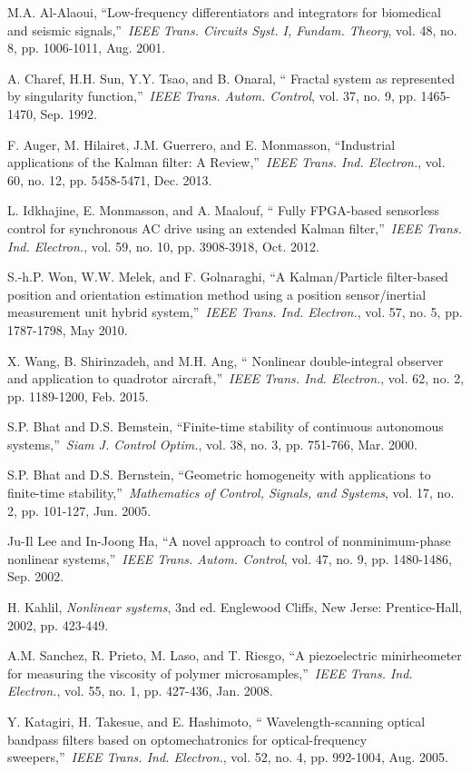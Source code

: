 \documentclass[10pt,journal]{IEEEtran}
\begin{document}
\begin{thebibliography}{99}
\bibitem{} M.A. Al-Alaoui, \textquotedblleft Low-frequency differentiators
and integrators for biomedical and seismic signals,\textquotedblright\ \emph{IEEE Trans. Circuits Syst. I, Fundam. Theory}, vol. 48, no. 8, pp.
1006-1011, Aug. 2001.

\bibitem{} A. Charef, H.H. Sun, Y.Y. Tsao, and B. Onaral, \textquotedblleft
Fractal system as represented by singularity function,\textquotedblright\
\emph{IEEE Trans. Autom. Control}, vol. 37, no. 9, pp. 1465-1470, Sep. 1992.

\bibitem{} F. Auger, M. Hilairet, J.M. Guerrero, and E. Monmasson,
\textquotedblleft Industrial applications of the Kalman filter: A
Review,\textquotedblright\ \emph{IEEE Trans. Ind. Electron.}, vol. 60, no.
12, pp. 5458-5471, Dec. 2013.

\bibitem{} L. Idkhajine, E. Monmasson, and A. Maalouf, \textquotedblleft
Fully FPGA-based sensorless control for synchronous AC drive using an
extended Kalman filter,\textquotedblright\ \emph{IEEE Trans. Ind. Electron.}, vol. 59, no. 10, pp. 3908-3918, Oct. 2012.

\bibitem{} S.-h.P. Won, W.W. Melek, and F. Golnaraghi, \textquotedblleft A
Kalman/Particle filter-based position and orientation estimation method
using a position sensor/inertial measurement unit hybrid
system,\textquotedblright\ \emph{IEEE Trans. Ind. Electron.}, vol. 57, no.
5, pp. 1787-1798, May 2010.

\bibitem{} X. Wang, B. Shirinzadeh, and M.H. Ang, \textquotedblleft
Nonlinear double-integral observer and application to quadrotor
aircraft,\textquotedblright\ \emph{IEEE Trans. Ind. Electron.}, vol. 62, no.
2, pp. 1189-1200, Feb. 2015.

\bibitem{} S.P. Bhat and D.S. Bemstein, \textquotedblleft Finite-time
stability of continuous autonomous systems,\textquotedblright\ \emph{Siam J.
Control Optim.}, vol. 38, no. 3, pp. 751-766, Mar. 2000.

\bibitem{} S.P. Bhat and D.S. Bernstein, \textquotedblleft Geometric
homogeneity with applications to finite-time stability,\textquotedblright\
\emph{Mathematics of Control, Signals, and Systems}, vol. 17, no. 2, pp.
101-127, Jun. 2005.

\bibitem{} Ju-Il Lee and In-Joong Ha, \textquotedblleft A novel approach to
control of nonminimum-phase nonlinear systems,\textquotedblright\ \emph{IEEE
Trans. Autom. Control}, vol. 47, no. 9, pp. 1480-1486, Sep. 2002.

\bibitem{} H. Kahlil, \emph{Nonlinear systems}, 3nd ed. Englewood Cliffs,
New Jerse: Prentice-Hall, 2002, pp. 423-449.

\bibitem{} A.M. Sanchez, R. Prieto, M. Laso, and T. Riesgo,
\textquotedblleft A piezoelectric minirheometer for measuring the viscosity
of polymer microsamples,\textquotedblright\ \emph{IEEE Trans. Ind. Electron.}, vol. 55, no. 1, pp. 427-436, Jan. 2008.

\bibitem{} Y. Katagiri, H. Takesue, and E. Hashimoto, \textquotedblleft
Wavelength-scanning optical bandpass filters based on optomechatronics for
optical-frequency sweepers,\textquotedblright\ \emph{IEEE Trans. Ind.
Electron.}, vol. 52, no. 4, pp. 992-1004, Aug. 2005.
\end{thebibliography}
\end{document}
